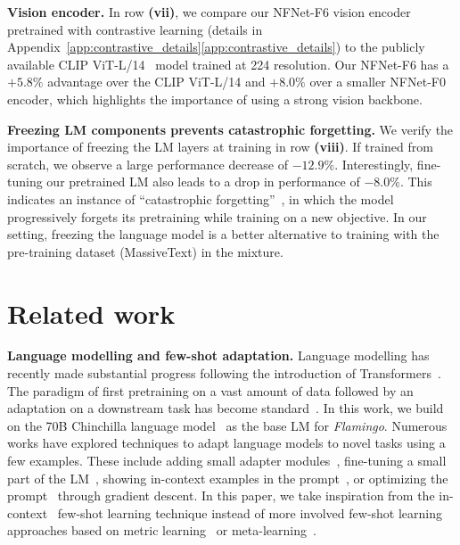 \textbf{Vision encoder.} In row \textbf{(vii)}, we compare our NFNet-F6 vision encoder pretrained with contrastive learning (details in Appendix~\ifwithappendix\ref{app:contrastive_details}\else\ref*{app:contrastive_details}\fi) to the publicly available CLIP ViT-L/14~\citep{clip} model trained at 224 resolution. Our NFNet-F6 has a $+5.8\%$ advantage over the CLIP ViT-L/14 and $+8.0\%$ over a smaller NFNet-F0 encoder, which highlights the importance of using a strong vision backbone.

\textbf{Freezing LM components prevents catastrophic forgetting.} We verify the importance of freezing the LM layers at training in row \textbf{(viii)}.
If trained from scratch, we observe a large performance decrease of $-12.9\%$.
Interestingly, fine-tuning our pretrained LM also leads to a drop in performance of $-8.0\%$.
This indicates an instance of ``catastrophic forgetting''~\citep{mccloskey1989catastrophic}, in which the model progressively forgets its pretraining while training on a new objective. In our setting, freezing the language model is a better alternative to training with the pre-training dataset (MassiveText) in the mixture.

\section{Related work}

\textbf{Language modelling and few-shot adaptation.} Language modelling has recently made substantial progress following the introduction of Transformers~\citep{vaswani2017attention}. The paradigm of first pretraining on a vast amount of data followed by an adaptation on a downstream task has become standard~\citep{mikolov2010recurrent,graves2013generating,jozefowicz2016exploring,howard2018universal,bert,t5,sutskever2011generating,gpt3}. In this work, we build on the 70B Chinchilla language model~\citep{chinchilla} as the base LM for \emph{Flamingo}.
Numerous works have explored techniques to adapt language models to novel tasks using a few examples. These include adding small adapter modules~\citep{houlsby2019parameter}, fine-tuning a small part of the LM~\citep{zaken_bitfit_2022}, showing in-context examples in the prompt~\citep{gpt3}, or optimizing the prompt~\citep{li2021prefix,lester2021power} through gradient descent. In this paper, we take inspiration from the in-context~\citep{gpt3} few-shot learning technique instead of more involved few-shot learning approaches based on metric learning~\citep{doersch2020crosstransformers,vinyals2016matching,snell2017prototypical,tian2020rethinking} or meta-learning~\citep{finn2017model,bertinetto2018meta,zintgraf2019fast,requeima2019fast,gordon2018meta,bertinetto2016learning}.

